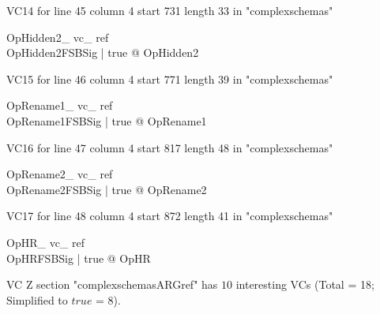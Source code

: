 \documentclass{article}
\begin{document}
VC14 for line 45 column 4 start 731 length 33 in "complexschemas"
\begin{theorem}{ OpHidden2\_ vc\_ ref}\\
 \forall OpHidden2FSBSig | true @ \pre OpHidden2 \\

\end{theorem}

VC15 for line 46 column 4 start 771 length 39 in "complexschemas"
\begin{theorem}{ OpRename1\_ vc\_ ref}\\
 \forall OpRename1FSBSig | true @ \pre OpRename1 \\

\end{theorem}

VC16 for line 47 column 4 start 817 length 48 in "complexschemas"
\begin{theorem}{ OpRename2\_ vc\_ ref}\\
 \forall OpRename2FSBSig | true @ \pre OpRename2 \\

\end{theorem}

VC17 for line 48 column 4 start 872 length 41 in "complexschemas"
\begin{theorem}{ OpHR\_ vc\_ ref}\\
 \forall OpHRFSBSig | true @ \pre OpHR \\

\end{theorem}



 VC Z section "complexschemasARGref" has $10$ interesting VCs (Total = 18; Simplified to $true$ = 8).



\end{document}
